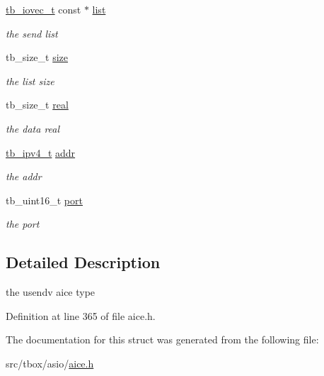 \begin{DoxyCompactItemize}
\item 
\hypertarget{structtb__aice__usendv__t_a027e4321378206e194dc52fa0b5a7a7b}{\hyperlink{structtb__iovec__t}{tb\-\_\-iovec\-\_\-t} const $\ast$ \hyperlink{structtb__aice__usendv__t_a027e4321378206e194dc52fa0b5a7a7b}{list}}\label{structtb__aice__usendv__t_a027e4321378206e194dc52fa0b5a7a7b}

\begin{DoxyCompactList}\small\item\em the send list \end{DoxyCompactList}\item 
\hypertarget{structtb__aice__usendv__t_aa69787e8dd9ca208dde316c26749b834}{tb\-\_\-size\-\_\-t \hyperlink{structtb__aice__usendv__t_aa69787e8dd9ca208dde316c26749b834}{size}}\label{structtb__aice__usendv__t_aa69787e8dd9ca208dde316c26749b834}

\begin{DoxyCompactList}\small\item\em the list size \end{DoxyCompactList}\item 
\hypertarget{structtb__aice__usendv__t_a9f3ea8d587e1d0de741324a782b981fc}{tb\-\_\-size\-\_\-t \hyperlink{structtb__aice__usendv__t_a9f3ea8d587e1d0de741324a782b981fc}{real}}\label{structtb__aice__usendv__t_a9f3ea8d587e1d0de741324a782b981fc}

\begin{DoxyCompactList}\small\item\em the data real \end{DoxyCompactList}\item 
\hypertarget{structtb__aice__usendv__t_acd4af9726b59dc15cccb0f1cdeecb6e2}{\hyperlink{uniontb__ipv4__t}{tb\-\_\-ipv4\-\_\-t} \hyperlink{structtb__aice__usendv__t_acd4af9726b59dc15cccb0f1cdeecb6e2}{addr}}\label{structtb__aice__usendv__t_acd4af9726b59dc15cccb0f1cdeecb6e2}

\begin{DoxyCompactList}\small\item\em the addr \end{DoxyCompactList}\item 
\hypertarget{structtb__aice__usendv__t_a99816440f08bbdc3dcb16122287377ca}{tb\-\_\-uint16\-\_\-t \hyperlink{structtb__aice__usendv__t_a99816440f08bbdc3dcb16122287377ca}{port}}\label{structtb__aice__usendv__t_a99816440f08bbdc3dcb16122287377ca}

\begin{DoxyCompactList}\small\item\em the port \end{DoxyCompactList}\end{DoxyCompactItemize}


\subsection{Detailed Description}
the usendv aice type 

Definition at line 365 of file aice.\-h.



The documentation for this struct was generated from the following file\-:\begin{DoxyCompactItemize}
\item 
src/tbox/asio/\hyperlink{aice_8h}{aice.\-h}\end{DoxyCompactItemize}
